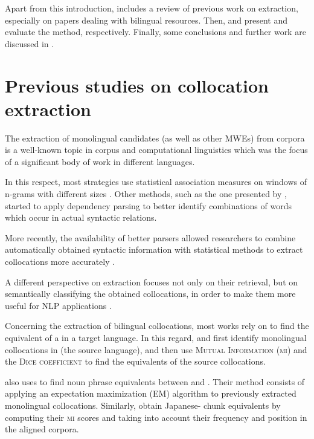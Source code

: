 \documentclass[output=paper,modfonts,nonflat]{langsci/langscibook}
\begin{document}
Apart from this introduction,  includes a review of previous work on 
extraction, especially on papers dealing with bilingual resources. Then, 
and  present and evaluate the method, respectively. Finally, some conclusions
and further work are discussed in .


%
\section{Previous studies on collocation extraction}
\label{garcia:sec:rw}

The extraction of monolingual  candidates (as well as other MWEs)
from corpora is a well-known topic in corpus and computational linguistics which was the focus of a significant body of work in different languages.

In this respect, most strategies use statistical association measures on windows of
n-grams with different sizes \citep{church1990, smadja1993}. Other methods, such as the
one presented by \citet{lin1999}, started to apply dependency parsing to better identify
combinations of words which occur in actual syntactic relations.

More recently, the availability of better parsers allowed researchers to combine automatically
obtained syntactic information with statistical methods to extract collocations more accurately \citep{evert2008,seretan2011syntax}.

A different perspective on  extraction focuses not only on their retrieval, but on
semantically classifying the obtained collocations, in order to make them more useful for NLP
applications \citep{wanner2006,wanner2016}.

Concerning the extraction of bilingual collocations, most works rely on  to find the
equivalent of a  in a target language. In this regard, \citet{smadja1992} and \citet{smadja1996}
first identify monolingual collocations in  (the source language), and then use \textsc{Mutual
  Information} (\textsc{mi}) and the \textsc{Dice coefficient} to find the  equivalents of the source
collocations. 

\citet{kupiec1993} also uses  to find noun phrase equivalents between 
and . Their method consists of applying an expectation maximization (EM) algorithm to previously
extracted monolingual collocations.
Similarly, \citet{haruno1996} obtain Japanese- chunk equivalents by computing
their \textsc{mi} scores and taking into account their frequency and position in the aligned corpora.
\end{document}
